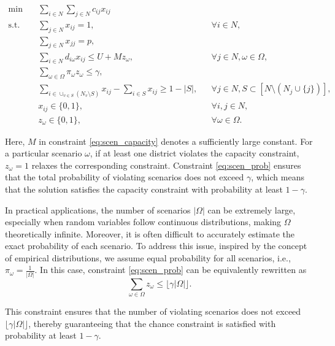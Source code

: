 \documentclass[preprint,12pt,authoryear]{elsarticle}
\begin{document}
\begin{align}
\min \quad & \sum_{i\in N}\sum_{j\in N} c_{ij} x_{ij} \label{eq:scen_obj} \\
\text{s.t.} \quad & \sum_{j\in N} x_{ij} = 1, && \forall i\in N, \label{eq:scen_assign} \\
& \sum_{j\in N} x_{jj} = p, \label{eq:scen_centers} \\
& \sum_{i\in N} d_{i\omega} x_{ij} \leqslant U + M z_\omega, && \forall j\in N, \omega\in\Omega, \label{eq:scen_capacity} \\
& \sum_{\omega\in\Omega} \pi_\omega z_\omega \leqslant \gamma, \label{eq:scen_prob} \\
& \sum_{i\in \cup_{v\in S}(N_v \setminus S)} x_{ij} - \sum_{i\in S} x_{ij} \geqslant 1 - |S|, && \forall j \in N, S \subset [N \setminus (N_j \cup \{j\})], \label{eq:scen_connectivity} \\
& x_{ij} \in \{0,1\}, && \forall i,j \in N, \label{eq:scen_xbinary} \\
& z_\omega \in \{0,1\}, && \forall \omega \in \Omega. \label{eq:scen_zbinary}
\end{align}

Here, $M$ in constraint \eqref{eq:scen_capacity} denotes a sufficiently large constant. For a particular scenario $\omega$, if at least one district violates the capacity constraint, $z_\omega = 1$ relaxes the corresponding constraint. Constraint \eqref{eq:scen_prob} ensures that the total probability of violating scenarios does not exceed $\gamma$, which means that the solution satisfies the capacity constraint with probability at least $1 - \gamma$.

In practical applications, the number of scenarios $|\Omega|$ can be extremely large, especially when random variables follow continuous distributions, making $\Omega$ theoretically infinite. Moreover, it is often difficult to accurately estimate the exact probability of each scenario. To address this issue, inspired by the concept of empirical distributions, we assume equal probability for all scenarios, i.e., $\pi_\omega = \frac{1}{|\Omega|}$. In this case, constraint \eqref{eq:scen_prob} can be equivalently rewritten as
\begin{equation}
\sum_{\omega\in\Omega} z_\omega \leqslant \lfloor \gamma |\Omega| \rfloor. \label{eq:scen_count}
\end{equation}

This constraint ensures that the number of violating scenarios does not exceed $\lfloor \gamma |\Omega| \rfloor$, thereby guaranteeing that the chance constraint is satisfied with probability at least $1 - \gamma$.
\end{document}

